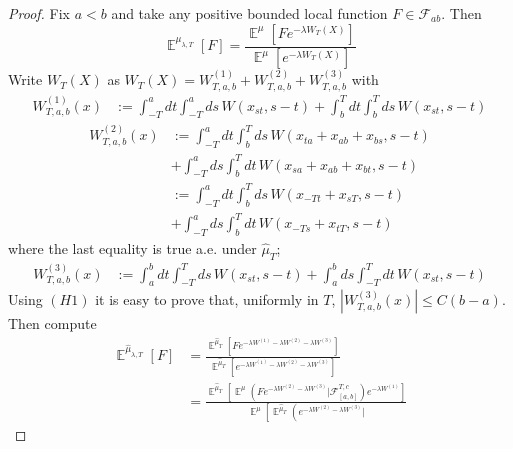 \documentclass[a4paper,12pt,reqno]{amsart}
\DeclareMathOperator{\expect}{{\mathbb E}}
\newcommand{\wmu}{\widehat\mu}
\begin{document}
\begin{proof}
Fix $ a < b $ and  take any positive bounded local function $F \in
\mathcal{F}_{ab}$.
Then 
$$
\expect^{\mu_{\lambda,T}}[F] = \frac{\expect^\mu \left[Fe^{-\lambda W_T(X)}\right]}{\expect^\mu \left[
      e^{-\lambda W_T(X)}\right]}
$$
Write $W_T(X)$ as
$W_T(X) = W_{T,a,b}^{(1)} + W_{T,a,b}^{(2)} + W_{T,a,b}^{(3)} 
$
with
\begin{equation}
  \begin{split}
W_{T,a,b}^{(1)}(x) & := 
\int_{-T}^a dt \int_{-T}^a ds \, W(x_{st},s-t)
   + 
\int_{b}^T dt \int_b^T ds \, W(x_{st},s-t)    
  \end{split}
\end{equation}
\begin{equation}
  \begin{split}
W_{T,a,b}^{(2)}(x) & := 
\int_{-T}^a dt \int_{b}^T ds \, W(x_{ta}+x_{ab}+x_{bs},s-t)
\\ & +
\int_{-T}^a ds \int_{b}^T dt \, W(x_{sa}+x_{ab}+x_{bt},s-t)    
\\& := 
\int_{-T}^a dt \int_{b}^T ds \, W(x_{-Tt}+x_{sT},s-t)
\\ & +
\int_{-T}^a ds \int_{b}^T dt \, W(x_{-Ts}+x_{tT},s-t)    
  \end{split}
\end{equation}
where the last equality is true a.e. under $\wmu_T$;
\begin{equation}
  \begin{split}
W_{T,a,b}^{(3)}(x) & := 
\int_{a}^b dt \int_{-T}^T ds \, W(x_{st},s-t)
+
\int_{a}^b ds \int_{-T}^T dt \, W(x_{st},s-t)    
  \end{split}
\end{equation}
Using $(H1)$  it is easy to prove that, uniformly in $T$,
$
|W_{T,a,b}^{(3)}(x)| \le C (b-a)
$.
Then compute
\begin{equation}
  \begin{split}
\expect^{\wmu_{\lambda,T}}\left[ F\right] & = \frac{\expect^{\wmu_T} \left[F e^{-\lambda W^{(1)} -\lambda W^{(2)} - \lambda W^{(3)}}\right]}{\expect^{\wmu_T} \left[
      e^{-\lambda W^{(1)} - \lambda W^{(2)} - \lambda
      W^{(3)}}\right]}
\\ & = \frac{\expect^{\wmu_T} \left[ \expect^\mu \left(F  e^{ -\lambda W^{(2)} - \lambda W^{(3)}} |
      \mathcal{F}^{T,c}_{[a,b]} \right) e^{-\lambda W^{(1)} }\right]}{
\expect^\mu \left[ \expect^{\wmu_T} \left(  e^{- \lambda W^{(2)} - \lambda W^{(3)}} |
}
\end{split}
\end{equation}
\end{proof}
\end{document}
